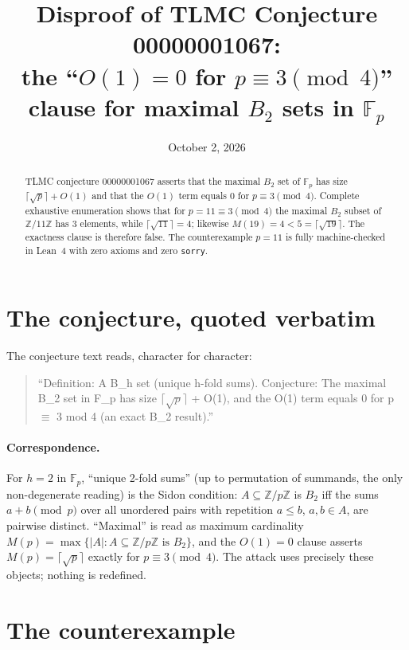 \documentclass[11pt]{article}
\title{Disproof of TLMC Conjecture 00000001067:\\
the ``$O(1)=0$ for $p\equiv 3\pmod 4$'' clause for maximal $B_2$ sets in $\mathbb{F}_p$}
\author{}
\date{October 2, 2026}
\begin{document}
\maketitle

\begin{abstract}
TLMC conjecture 00000001067 asserts that the maximal $B_2$ set of $\mathbb{F}_p$
has size $\lceil\sqrt p\rceil+O(1)$ and that the $O(1)$ term equals $0$ for
$p\equiv 3\pmod 4$.  Complete exhaustive enumeration shows that for
$p=11\equiv 3\pmod 4$ the maximal $B_2$ subset of $\mathbb{Z}/11\mathbb{Z}$ has
$3$ elements, while $\lceil\sqrt{11}\rceil=4$; likewise $M(19)=4<5=\lceil\sqrt{19}\rceil$.
The exactness clause is therefore false.  The counterexample $p=11$ is fully
machine-checked in Lean~4 with zero axioms and zero \texttt{sorry}.
\end{abstract}

\section{The conjecture, quoted verbatim}

The conjecture text reads, character for character:
\begin{quote}
``Definition: A B\_h set (unique h-fold sums). Conjecture: The maximal B\_2 set
in F\_p has size $\lceil\sqrt p\rceil$ + O(1), and the O(1) term equals 0 for
p $\equiv$ 3 mod 4 (an exact B\_2 result).''
\end{quote}

\paragraph{Correspondence.}  For $h=2$ in $\mathbb{F}_p$, ``unique 2-fold sums''
(up to permutation of summands, the only non-degenerate reading) is the Sidon
condition: $A\subseteq\mathbb{Z}/p\mathbb{Z}$ is $B_2$ iff the sums $a+b\pmod p$
over all unordered pairs with repetition $a\le b$, $a,b\in A$, are pairwise
distinct.  ``Maximal'' is read as maximum cardinality
$M(p)=\max\{|A|: A\subseteq\mathbb{Z}/p\mathbb{Z}\text{ is }B_2\}$, and the
$O(1)=0$ clause asserts $M(p)=\lceil\sqrt p\rceil$ exactly for $p\equiv3\pmod4$.
The attack uses precisely these objects; nothing is redefined.

\section{The counterexample}
\end{document}
